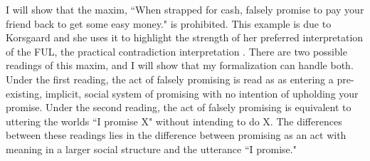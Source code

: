 %
\begin{isabellebody}%
%
%
\isadelimtheory
%
\endisadelimtheory
%
\isatagtheory
%
\endisatagtheory
{\isafoldtheory}%
%
\isadelimtheory
%
\endisadelimtheory
%
\isadelimdocument
%
\endisadelimdocument
%
\isatagdocument
%
\isamarkuptrue%
%
\endisatagdocument
{\isafolddocument}%
%
\isadelimdocument
%
\endisadelimdocument
%
\begin{isamarkuptext}%
I will show that the maxim, ``When strapped for cash, falsely promise to pay your friend back
to get some easy money." is prohibited. This example is due to Korsgaard and she uses it to highlight 
the strength of her preferred interpretation of the FUL, the practical contradiction interpretation \cite{KorsgaardFUL}.
There are two possible readings of this maxim, and I will show that my formalization can handle both. 
Under the first reading, the act of falsely promising is read as
as entering a pre-existing, implicit, social system of promising with no intention of upholding your 
promise. Under the second reading, the act of falsely promising is equivalent to uttering the worlds 
``I promise X" without intending to do X. The differences between these readings lies in the difference 
between promising as an act with meaning in a larger social structure and the utterance ``I promise."


\end{isamarkuptext}
\end{isabellebody}
